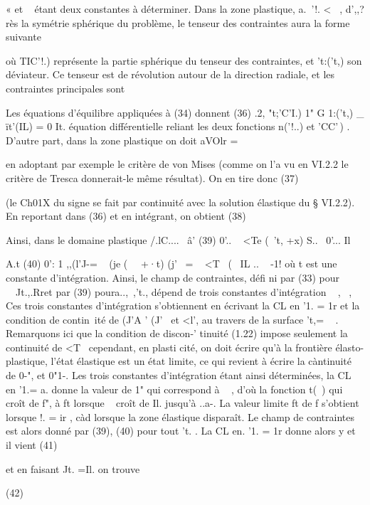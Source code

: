{{{{{{{{{{{{{{{{{« et ~ étant deux constantes à déterminer. Dans la zone plastique, a.~'!. <~ , d',,?rès la symétrie sphérique du problème, le tenseur des contraintes aura la forme suivante 

où TIC'!.) représente la partie sphérique du tenseur des contraintes, et 't:('t,) son déviateur. Ce tenseur est de révolution autour de la direction radiale, et les contraintes principales sont 

Les équations d'équilibre appliquées à (34) donnent 
(36) 	.2, "t;'C'I.) 1" G 1:('t,) _ ït'(IL) = 0 It. 
équation différentielle reliant les deux fonctions n('!..) et 'CC'\,) . 
D'autre part, dans la zone plastique on doit aVOlr 
= 



en adoptant par exemple le critère de von Mises (comme on l'a vu en VI.2.2 le critère de Tresca donnerait-le même résultat). On en tire donc 
(37) 

(le Ch01X du signe se fait par continuité avec la solution élastique du § VI.2.2). En reportant dans (36) et en intégrant, on obtient 
(38) 

Ainsi, dans le domaine plastique 
/.lC.... ~â'
(39) 0'.. 
~ <Te (~'t, +x) S..~ 0'... Il}
A.t 
(40) 0': 1 ,,(l'J-= ~ (je (~~ +·t) (j'~ = ~ <T~ ( ~IL .. ~ -1! 
où t est une constante d'intégration. Ainsi, le champ de contraintes, défi­
ni par (33) pour ~~Jt.,.Rret par (39) poura..,~,'t., dépend de trois constantes d'intégration ~ ,~ , ~ Ces trois constantes d'intégration s'obtiennent en écrivant la CL en '1. = 1r et la condition de contin~ité de (J'A ' (J'~ et <l', au travers de la surface 't,= ~ . Remarquons ici que la condition de discon-' tinuité (1.22) impose seulement la continuité de <T~ cependant, en plasti­
cité, on doit écrire qu'à la frontière élasto-plastique, l'état élastique est un état limite, ce qui revient à écrire la càntinuité de 0-", et 0"1-. Les 
trois constantes d'intégration étant ainsi déterminées, la CL en '1.= a. donne la valeur de 1" qui correspond à ~ , d'où la fonction t(~) qui croît de f", à ft lorsque ~ croît de Il. jusqu'à ..a-. La valeur limite ft de f s'ob­tient lorsque !. = ir , càd lorsque la zone élastique disparaît. Le champ de contraintes est alors donné par (39), (40) pour tout 't. . La CL en. '1. = 1r donne alors y et il vient 
(41) 

et en faisant Jt. =Il. on trouve 

(42) 

}}}}}}}}}}}}}}}}
